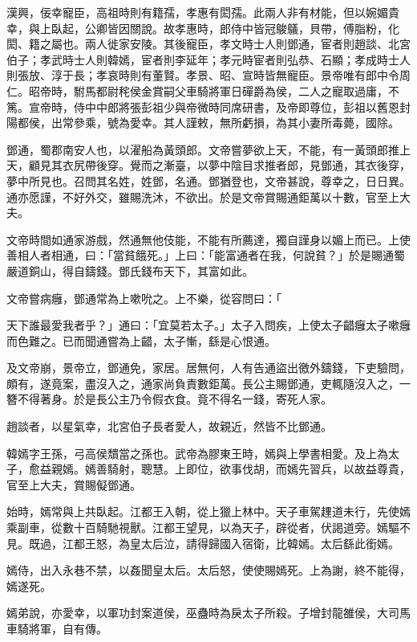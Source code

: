 
\begin{pinyinscope}
漢興，佞幸寵臣，高祖時則有籍孺，孝惠有閎孺。此兩人非有材能，但以婉媚貴幸，與上臥起，公卿皆因關說。故孝惠時，郎侍中皆冠鵔鸃，貝帶，傅脂粉，化閎、籍之屬也。兩人徙家安陵。其後寵臣，孝文時士人則鄧通，宦者則趙談、北宮伯子；孝武時士人則韓嫣，宦者則李延年；孝元時宦者則弘恭、石顯；孝成時士人則張放、淳于長；孝哀時則有董賢。孝景、昭、宣時皆無寵臣。景帝唯有郎中令周仁。昭帝時，駙馬都尉秺侯金賞嗣父車騎將軍日磾爵為侯，二人之寵取過庸，不篤。宣帝時，侍中中郎將張彭祖少與帝微時同席研書，及帝即尊位，彭祖以舊恩封陽都侯，出常參乘，號為愛幸。其人謹敕，無所虧損，為其小妻所毒薨，國除。

鄧通，蜀郡南安人也，以濯船為黃頭郎。文帝嘗夢欲上天，不能，有一黃頭郎推上天，顧見其衣尻帶後穿。覺而之漸臺，以夢中陰目求推者郎，見鄧通，其衣後穿，夢中所見也。召問其名姓，姓鄧，名通。鄧猶登也，文帝甚說，尊幸之，日日異。通亦愿謹，不好外交，雖賜洗沐，不欲出。於是文帝賞賜通鉅萬以十數，官至上大夫。

文帝時間如通家游戲，然通無他伎能，不能有所薦達，獨自謹身以媚上而已。上使善相人者相通，曰：「當貧餓死。」上曰：「能富通者在我，何說貧？」於是賜通蜀嚴道銅山，得自鑄錢。鄧氏錢布天下，其富如此。

文帝嘗病癰，鄧通常為上嗽吮之。上不樂，從容問曰：「

天下誰最愛我者乎？」通曰：「宜莫若太子。」太子入問疾，上使太子齰癰太子嗽癰而色難之。已而聞通嘗為上齰，太子慚，繇是心恨通。

及文帝崩，景帝立，鄧通免，家居。居無何，人有告通盜出徼外鑄錢，下吏驗問，頗有，遂竟案，盡沒入之，通家尚負責數鉅萬。長公主賜鄧通，吏輒隨沒入之，一簪不得著身。於是長公主乃令假衣食。竟不得名一錢，寄死人家。

趙談者，以星氣幸，北宮伯子長者愛人，故親近，然皆不比鄧通。

韓嫣字王孫，弓高侯穨當之孫也。武帝為膠東王時，嫣與上學書相愛。及上為太子，愈益親嫣。嫣善騎射，聰慧。上即位，欲事伐胡，而嫣先習兵，以故益尊貴，官至上大夫，賞賜儗鄧通。

始時，嫣常與上共臥起。江都王入朝，從上獵上林中。天子車駕䟆道未行，先使嫣乘副車，從數十百騎馳視獸。江都王望見，以為天子，辟從者，伏謁道旁。嫣驅不見。既過，江都王怒，為皇太后泣，請得歸國入宿衛，比韓嫣。太后繇此銜嫣。

嫣侍，出入永巷不禁，以姦聞皇太后。太后怒，使使賜嫣死。上為謝，終不能得，嫣遂死。

嫣弟說，亦愛幸，以軍功封案道侯，巫蠱時為戾太子所殺。子增封龍雒侯，大司馬車騎將軍，自有傳。


\end{pinyinscope}
